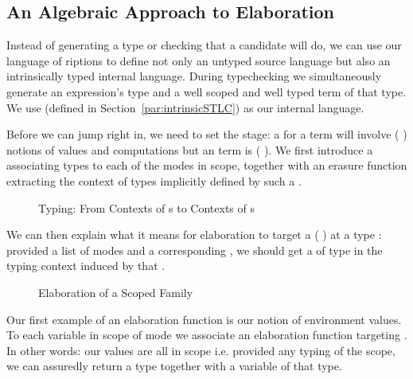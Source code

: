 \subsection{An Algebraic Approach to Elaboration}\label{section:elaboration}

Instead of generating a type or checking that a candidate will do, we
can use our language of riptions to define not only an
untyped source language but also an intrinsically typed internal
language. During typechecking we simultaneously generate an
expression's type and a well scoped and well typed term of that
type. We use  (defined in Section~\ref{par:intrinsicSTLC}) as
our internal language.

Before we can jump right in, we need to set the stage: a  for a
 term will involve ({ }) notions of values and
computations but an  term is ({ }). We first
introduce a  associating types to each of the modes in scope,
together with an erasure function  extracting the context of types
implicitly defined by such a .

\begin{figure}[h]
\begin{minipage}[t]{0.4\textwidth}
\end{minipage}
\begin{minipage}[t]{0.5\textwidth}
\end{minipage}
\caption{Typing: From Contexts of s to Contexts of s\label{fig:typingmodes}}
\end{figure}

We can then explain what it means for elaboration to target  a
({ }) at a type : provided a list of modes and a
corresponding , we should get a  of type  in the
typing context induced by that .

\begin{figure}[h]
\caption{Elaboration of a Scoped Family}
\end{figure}

Our first example of an elaboration function is our notion of environment values.
To each variable in scope of mode  we associate an elaboration function
targeting . In other words: our values are all in scope i.e. provided any
typing of the scope, we can assuredly return a type together with a variable of
that type.

